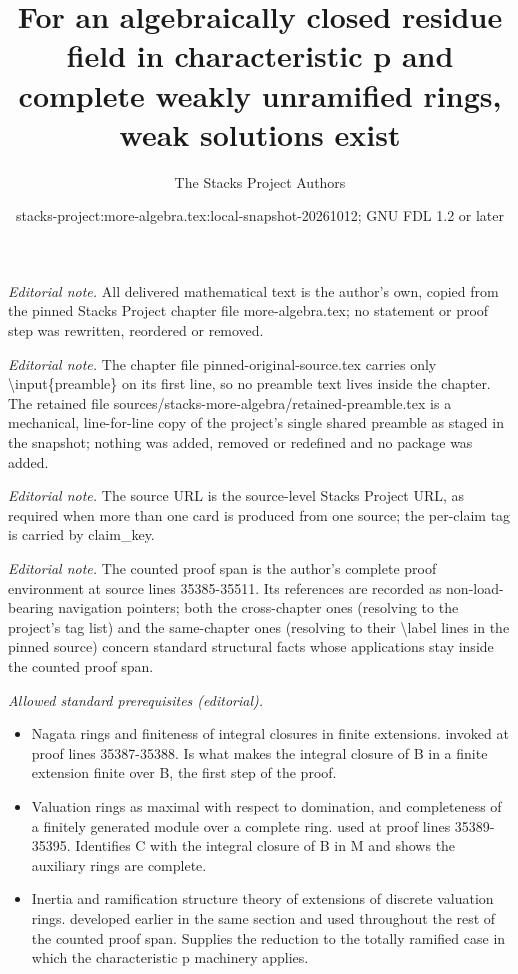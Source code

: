\documentclass[10pt,a4paper]{amsart}
\title{For an algebraically closed residue field in characteristic p and complete weakly unramified rings, weak solutions exist}
\author{The Stacks Project Authors}
\date{stacks-project:more-algebra.tex:local-snapshot-20261012; GNU FDL 1.2 or later}
\theoremstyle{plain}
\theoremstyle{definition}
\theoremstyle{remark}
\numberwithin{equation}{subsection}
\begin{document}
\maketitle
\setcounter{subsection}{1}
\noindent\textit{Editorial note.} All delivered mathematical text is the author's own, copied from the pinned Stacks Project chapter file more-algebra.tex; no statement or proof step was rewritten, reordered or removed.\par\medskip
\noindent\textit{Editorial note.} The chapter file pinned-original-source.tex carries only \textbackslash{}input\{preamble\} on its first line, so no preamble text lives inside the chapter. The retained file sources/stacks-more-algebra/retained-preamble.tex is a mechanical, line-for-line copy of the project's single shared preamble as staged in the snapshot; nothing was added, removed or redefined and no package was added.\par\medskip
\noindent\textit{Editorial note.} The source URL is the source-level Stacks Project URL, as required when more than one card is produced from one source; the per-claim tag is carried by claim\_key.\par\medskip
\noindent\textit{Editorial note.} The counted proof span is the author's complete proof environment at source lines 35385-35511. Its references are recorded as non-load-bearing navigation pointers; both the cross-chapter ones (resolving to the project's tag list) and the same-chapter ones (resolving to their \textbackslash{}label lines in the pinned source) concern standard structural facts whose applications stay inside the counted proof span.\par\medskip
\noindent\textit{Allowed standard prerequisites (editorial).}\begin{itemize}
\item Nagata rings and finiteness of integral closures in finite extensions. invoked at proof lines 35387-35388. Is what makes the integral closure of B in a finite extension finite over B, the first step of the proof.
\item Valuation rings as maximal with respect to domination, and completeness of a finitely generated module over a complete ring. used at proof lines 35389-35395. Identifies C with the integral closure of B in M and shows the auxiliary rings are complete.
\item Inertia and ramification structure theory of extensions of discrete valuation rings. developed earlier in the same section and used throughout the rest of the counted proof span. Supplies the reduction to the totally ramified case in which the characteristic p machinery applies.
\end{itemize}\medskip
\end{document}
